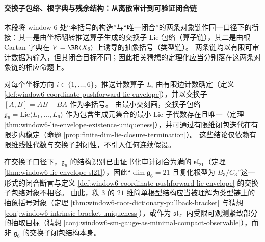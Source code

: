 
\paragraph{交换子包络、根字典与残余结构：从离散审计到可验证闭合链}
本段将 window-\(6\) 处“李括号的构造”与“唯一闭合”的两条对象链作同一口径下的衔接：其一是由坐标翻转推送算子生成的交换子 Lie 包络（算子链），其二是由根--Cartan 字典在 \(V=\RR\langle X_6\rangle\) 上诱导的抽象括号（类型链）。
两条链均以有限可审计数据为输入，但其闭合目标不同；因此相关猜想的定理化应当分别落在这两条对象链的相应命题上。

\begin{remark}[交换子包络的严格构造与唯一闭合]\label{rem:window6-commutator-envelope-unique-closure}
对每个坐标方向 \(i\in\{1,\dots,6\}\)，推送计数算子 \(L_i\) 由有限边计数确定（定义 \ref{def:window6-coordinate-pushforward-lie-envelope}），并以交换子 \([A,B]=AB-BA\) 作为李括号。
由最小交刻画，交换子包络
\(
\mathfrak g_6=\mathrm{Lie}\langle L_1,\dots,L_6\rangle
\)
作为包含生成元集合的最小 Lie 子代数存在且唯一（定理 \ref{thm:window6-lie-envelope-existence-uniqueness}），并可通过有限维闭包迭代在有限步内稳定（命题 \ref{prop:finite-dim-lie-closure-termination}）。
这些结论仅依赖有限维线性代数与交换子封闭性，不引入任何连续假设。
\end{remark}

\begin{remark}[关于根型预期的对象层区分]\label{rem:window6-conj-10170-object-correction}
在交换子口径下，\(\mathfrak g_6\) 的结构识别已由证书化审计闭合为满的 \(\mathfrak{sl}_{21}\)（定理 \ref{thm:window6-lie-envelope-sl21}），因此“\(\dim\mathfrak g_6=21\) 且复化根型为 \(B_3/C_3\)”这一形式的闭合断言与定义 \ref{def:window6-coordinate-pushforward-lie-envelope} 的交换子包络对象不相容。
由此，秩 \(3\) 的 \(21\) 维简单根型结构应当被理解为类型链上的抽象括号对象（定理 \ref{thm:window6-root-dictionary-pullback-bracket} 与猜想 \ref{conj:window6-intrinsic-bracket-uniqueness}），或作为 \(\mathfrak{sl}_{21}\) 内受限可观测紧致部分的抽取目标（猜想 \ref{conj:window6-sm-gauge-as-minimal-compact-observable}），而非 \(\mathfrak g_6\) 的交换子闭包结构本身。
\end{remark}

